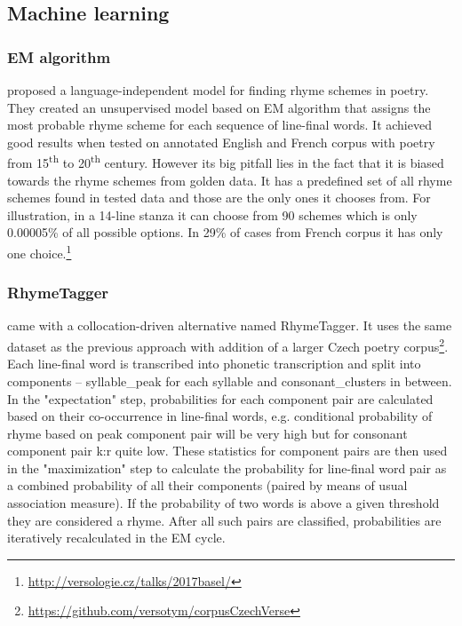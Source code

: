 \subsection{Machine learning}
\subsubsection*{EM algorithm}
\cite{reddy2011unsupervised} proposed a language-independent model for finding rhyme schemes in poetry. They created an unsupervised model based on EM algorithm that assigns the most probable rhyme scheme for each sequence of line-final words. It achieved good results when tested on annotated English and French corpus with poetry from 15\textsuperscript{th} to 20\textsuperscript{th} century. However its big pitfall lies in the fact that it is biased towards the rhyme schemes from golden data. It has a predefined set of all rhyme schemes found in tested data and those are the only ones it chooses from. For illustration, in a 14-line stanza it can choose from 90 schemes which is only 0.00005\% of all possible options. In 29\% of cases from French corpus it has only one choice.\footnote{\url{http://versologie.cz/talks/2017basel/}}

\subsubsection*{RhymeTagger}
\cite{plechavc2018collocation} came with a collocation-driven alternative named RhymeTagger. It uses the same dataset as the previous approach with addition of a larger Czech poetry corpus\footnote{\url{https://github.com/versotym/corpusCzechVerse}}. Each line-final word is transcribed into phonetic transcription and split into components -- \gls{syllable_peak} for each syllable and \gls{consonant_clusters} in between. In the "expectation" step, probabilities for each component pair are calculated based on their co-occurrence in line-final words, e.g. conditional probability of rhyme based on peak component pair  will be very high but for consonant component pair k:r quite low. These statistics for component pairs are then used in the "maximization" step to calculate the probability for line-final word pair as a combined probability of all their components (paired by means of usual association measure). If the probability of two words is above a given threshold they are considered a rhyme. After all such pairs are classified, probabilities are iteratively recalculated in the EM cycle. 

